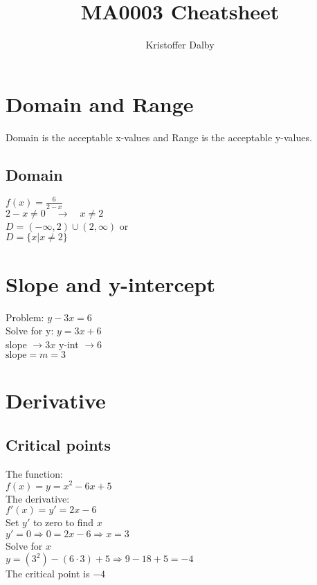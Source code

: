 \documentclass[a4paper, 10pt]{article}
\title{MA0003 Cheatsheet}
\author{Kristoffer Dalby}
\date{}
\begin{document}
\maketitle

\thispagestyle{empty}
\newpage
{}
\setcounter{page}{1}

\section{Domain and Range}
Domain is the acceptable x-values and Range is the acceptable y-values.

\subsection{Domain}
$f(x) = \frac{6}{2-x}$\\
$2-x \neq 0 \quad \rightarrow \quad x \neq 2$\\
$D = (-\infty, 2) \cup (2, \infty)$ 
\quad or\\
$D = \{x | x \neq 2 \}$

\section{Slope and y-intercept}
Problem: $y-3x = 6$\\ 
Solve for y: $y=3x+6$\\
slope $\rightarrow 3x$ \quad y-int $\rightarrow 6$\\
$\text{slope} = m = 3$



\section{Derivative}

\subsection{Critical points}
The function:\\
$f(x) = y=x^2-6x+5$\\
The derivative:\\
$f'(x) = y'= 2x-6$\\
Set $y'$ to zero to find $x$\\
$y' = 0 \Rightarrow 0 = 2x-6 \Rightarrow x=3$\\
Solve for $x$\\
$y = (3^2) - (6 \cdot 3) + 5 \Rightarrow 9 - 18 + 5 = -4$\\
The critical point is $-4$
\end{document}
